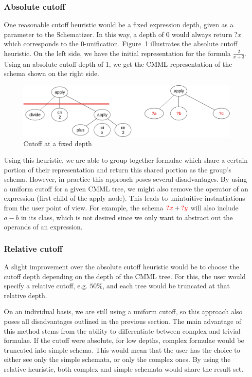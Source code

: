 \subsubsection{Absolute cutoff}\label{subsubsec:absolute_cutoff}
One reasonable cutoff heuristic would be a fixed expression depth, given as a
parameter to the Schematizer. In this way, a depth of 0 would always return
$?x$ which corresponds to the 0-unification.
Figure~\ref{fig:cutoff_naive} illustrates the absolute cutoff heuristic.
On the left side, we have the initial \cmml representation for the formula
$\frac{2}{x+3}$. Using an absolute cutoff depth of 1, we get the CMML
representation of the schema shown on the right side.

\begin{figure}[ht]\centering
    \includegraphics[scale=0.3]{img/cutoff_naive.png}
    \caption{Cutoff at a fixed depth}\label{fig:cutoff_naive}
\end{figure}
\FloatBarrier

Using this heuristic, we are able to group together formulae which share a
certain portion of their \cmml representation and return this shared portion as
the group's schema. However, in practice this approach poses several
disadvantages. By using a uniform cutoff for a given CMML tree, we might also
remove the operator of an expression (first child of the \textsf{apply} node).
This leads to unintuitive instantiations from the user point of view. For
example, the schema $\textcolor{red}{?x} + \textcolor{red}{?y}$ will also include $a - b$ in its
class, which is not desired since we only want to abstract out the operands of
an expression.

\subsubsection{Relative cutoff}\label{subsubsec:relative_cutoff}
A slight improvement over the absolute cutoff heuristic would be to choose the
cutoff depth depending on the depth of the CMML tree. For this, the user would
specify a relative cutoff, e.g. $50\%$, and each tree would be truncated at
that relative depth.

On an individual basis, we are still using a uniform cutoff, so this approach
also poses all disadvantages outlined in the previous section. The main
advantage of this method stems from the ability to differentiate between
complex and trivial formulae. If the cutoff were absolute, for low depths,
complex formulae would be truncated into simple schema. This would mean that
the user has the choice to either see only the simple schemata, or only the
complex ones. By using the relative heuristic, both complex and simple schemata
would share the result set.

